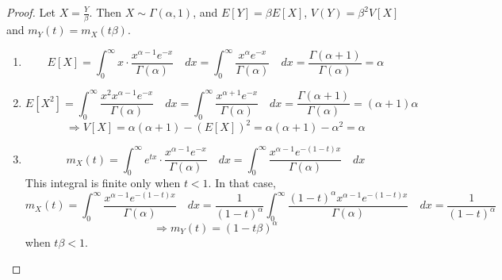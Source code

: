 \begin{proof}
Let $X = \frac{Y}{\beta}$. Then $X \sim \Gamma(\alpha, 1)$, and $E[Y] =
\beta E[X]$, $V(Y) = \beta^2 V[X]$ and $m_Y(t) = m_X(t\beta)$.
\begin{enumerate}[noitemsep, topsep=0em]
\item
\[
    E[X] = \int_{0}^{\infty}
               x \cdot \frac{x^{\alpha - 1}e^{-x}}{\Gamma(\alpha)}
           \quad dx
         = \int_{0}^{\infty}
               \frac{x^\alpha e^{-x}}{\Gamma(\alpha)}
           \quad dx
         = \frac{\Gamma(\alpha + 1)}{\Gamma(\alpha)}
         = \alpha
\]
\item
\[
    E[X^2] = \int_{0}^{\infty} \frac
                 {x^2 x^{\alpha - 1} e^{-x}}
                 {\Gamma(\alpha)}
             \quad dx
           = \int_{0}^{\infty} \frac
                 {x^{\alpha + 1} e^{-x}}
                 {\Gamma(\alpha)}
             \quad dx
           = \frac{\Gamma(\alpha + 1)}{\Gamma(\alpha)}
           = (\alpha + 1) \alpha
\]
\[
    \Rightarrow
    V[X] = \alpha(\alpha + 1) - (E[X])^2
         = \alpha(\alpha + 1) - \alpha^2
         = \alpha
\]
\item
\[
    m_X(t) = \int_{0}^{\infty}
                 e^{tx} \cdot \frac
                 {x^{\alpha - 1} e^{-x}}
                 {\Gamma(\alpha)}
             \quad dx
           = \int_{0}^{\infty} \frac 
                 {x^{\alpha - 1} e^{-(1 - t)x}}
                 {\Gamma(\alpha)}
             \quad dx
\]
This integral is finite only when $t < 1$. In that case,
\[
    m_X(t) = \int_{0}^{\infty} \frac 
                 {x^{\alpha - 1} e^{-(1 - t)x}}
                 {\Gamma(\alpha)}
             \quad dx
           = \frac{1}{(1 - t)^\alpha}
             \int_{0}^{\infty} \frac 
                 {(1 - t)^\alpha x^{\alpha - 1} e^{-(1 - t)x}}
                 {\Gamma(\alpha)}
             \quad dx
           = \frac{1}{(1 - t)^\alpha}
\]
\[
    \Rightarrow
    m_Y(t) = (1 - t\beta)^\alpha
\]
when $t\beta < 1$.
\end{enumerate}
\end{proof}